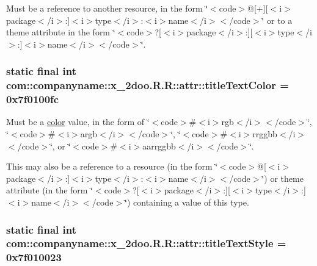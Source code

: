 Must be a reference to another resource, in the form \char`\"{}$<$code$>$@\mbox{[}+\mbox{]}\mbox{[}$<$i$>$package$<$/i$>$:\mbox{]}$<$i$>$type$<$/i$>$:$<$i$>$name$<$/i$>$$<$/code$>$\char`\"{} or to a theme attribute in the form \char`\"{}$<$code$>$?\mbox{[}$<$i$>$package$<$/i$>$:\mbox{]}\mbox{[}$<$i$>$type$<$/i$>$:\mbox{]}$<$i$>$name$<$/i$>$$<$/code$>$\char`\"{}. \hypertarget{classcom_1_1companyname_1_1x__2doo_1_1_r_1_1attr_82d4d30477ffe7011f23274c9ec965a5}{
\subsubsection[{titleTextColor}]{\setlength{\rightskip}{0pt plus 5cm}static final int com::companyname::x\_\-2doo.R.R::attr::titleTextColor = 0x7f0100fc}}
\label{classcom_1_1companyname_1_1x__2doo_1_1_r_1_1attr_82d4d30477ffe7011f23274c9ec965a5}


Must be a \hyperlink{classcom_1_1companyname_1_1x__2doo_1_1_r_1_1color}{color} value, in the form of \char`\"{}$<$code$>$\#$<$i$>$rgb$<$/i$>$$<$/code$>$\char`\"{}, \char`\"{}$<$code$>$\#$<$i$>$argb$<$/i$>$$<$/code$>$\char`\"{}, \char`\"{}$<$code$>$\#$<$i$>$rrggbb$<$/i$>$$<$/code$>$\char`\"{}, or \char`\"{}$<$code$>$\#$<$i$>$aarrggbb$<$/i$>$$<$/code$>$\char`\"{}. 

This may also be a reference to a resource (in the form \char`\"{}$<$code$>$@\mbox{[}$<$i$>$package$<$/i$>$:\mbox{]}$<$i$>$type$<$/i$>$:$<$i$>$name$<$/i$>$$<$/code$>$\char`\"{}) or theme attribute (in the form \char`\"{}$<$code$>$?\mbox{[}$<$i$>$package$<$/i$>$:\mbox{]}\mbox{[}$<$i$>$type$<$/i$>$:\mbox{]}$<$i$>$name$<$/i$>$$<$/code$>$\char`\"{}) containing a value of this type. \hypertarget{classcom_1_1companyname_1_1x__2doo_1_1_r_1_1attr_dcb150fd31ab9183bee97759585558cd}{
\subsubsection[{titleTextStyle}]{\setlength{\rightskip}{0pt plus 5cm}static final int com::companyname::x\_\-2doo.R.R::attr::titleTextStyle = 0x7f010023}}
\label{classcom_1_1companyname_1_1x__2doo_1_1_r_1_1attr_dcb150fd31ab9183bee97759585558cd}


